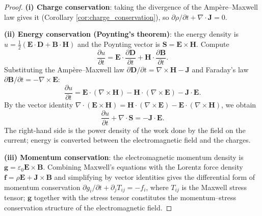 \begin{proof}
\textbf{(i) Charge conservation}: taking the divergence of the Amp\`ere--Maxwell law gives it (Corollary \ref{cor:charge_conservation}), so $\partial\rho/\partial t + \nabla\cdot\mathbf{J}=0$.

\textbf{(ii) Energy conservation (Poynting's theorem)}: the energy density is $u = \frac12(\mathbf{E}\cdot\mathbf{D} + \mathbf{B}\cdot\mathbf{H})$ and the Poynting vector is $\mathbf{S} = \mathbf{E}\times\mathbf{H}$. Compute
\[
\frac{\partial u}{\partial t} = \mathbf{E}\cdot\frac{\partial\mathbf{D}}{\partial t} + \mathbf{H}\cdot\frac{\partial\mathbf{B}}{\partial t}.
\]
Substituting the Amp\`ere--Maxwell law $\partial\mathbf{D}/\partial t = \nabla\times\mathbf{H} - \mathbf{J}$ and Faraday's law $\partial\mathbf{B}/\partial t = -\nabla\times\mathbf{E}$:
\[
\frac{\partial u}{\partial t} = \mathbf{E}\cdot(\nabla\times\mathbf{H}) - \mathbf{H}\cdot(\nabla\times\mathbf{E}) - \mathbf{J}\cdot\mathbf{E}.
\]
By the vector identity $\nabla\cdot(\mathbf{E}\times\mathbf{H}) = \mathbf{H}\cdot(\nabla\times\mathbf{E}) - \mathbf{E}\cdot(\nabla\times\mathbf{H})$, we obtain
\[
\frac{\partial u}{\partial t} + \nabla\cdot\mathbf{S} = -\mathbf{J}\cdot\mathbf{E}.
\]
The right-hand side is the power density of the work done by the field on the current; energy is converted between the electromagnetic field and the charges.

\textbf{(iii) Momentum conservation}: the electromagnetic momentum density is $\mathbf{g} = \varepsilon_0\mathbf{E}\times\mathbf{B}$. Combining Maxwell's equations with the Lorentz force density $\mathbf{f} = \rho\mathbf{E} + \mathbf{J}\times\mathbf{B}$ and simplifying by vector identities gives the differential form of momentum conservation $\partial g_i/\partial t + \partial_j T_{ij} = -f_i$, where $T_{ij}$ is the Maxwell stress tensor; $\mathbf{g}$ together with the stress tensor constitutes the momentum--stress conservation structure of the electromagnetic field.
\end{proof}

